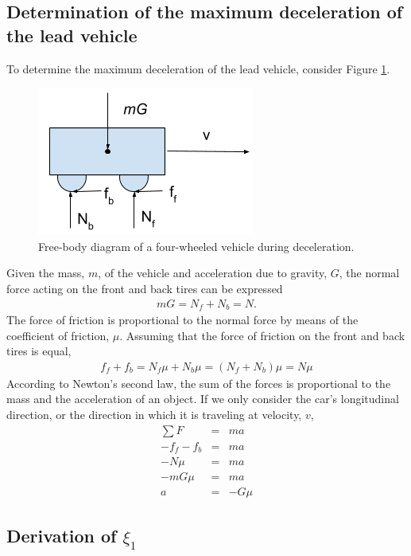 \documentclass[conference]{IEEEtran}
\begin{document}
\onecolumn
\begin{appendix}

\subsection{Determination of the maximum deceleration of the lead vehicle}
To determine the maximum deceleration of the lead vehicle, consider Figure \ref{fig3}.

\begin{figure}[htbp]
\centerline{\includegraphics[width=2.00 in]{maxDecel.png}}
\caption{Free-body diagram of a four-wheeled vehicle during deceleration.}
\label{fig3}
\end{figure}

Given the mass, $m$, of the vehicle and acceleration due to gravity, $G$, the normal force acting on the front and back tires can be expressed
\begin{eqnarray*}
mG=N_f+N_b=N.
\end{eqnarray*}
The force of friction is proportional to the normal force by means of the coefficient of friction, $\mu$. Assuming that the force of friction on the front and back tires is equal,
\begin{eqnarray*}
f_f+f_b=N_f\mu+N_b\mu=(N_f+N_b)\mu=N\mu
\end{eqnarray*}
According to Newton's second law, the sum of the forces is proportional to the mass and the acceleration of an object. If we only consider the car's longitudinal direction, or the direction in which it is traveling at velocity, $v$,
\begin{eqnarray*}
\sum F &=& ma \\
-f_f-f_b &=& ma \\
-N\mu &=& ma \\
-mG\mu &=& ma \\
a &=& -G\mu
\end{eqnarray*}




\subsection{Derivation of $\xi_1$}


\end{appendix}
\end{document}
